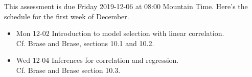\documentclass{ccg-topic}
\author{Colton Grainger}
\date{2019-11-29}
\begin{document}
\maketitle

\begin{center}
\end{center}

This assessment is due Friday 2019-12-06 at 08:00 Mountain Time.
Here's the schedule for the first week of December.

\begin{itemize}
    \item Mon 12-02 Introduction to model selection with linear correlation. \\
Cf. Brase and Brase, sections 10.1 and 10.2.
    \item Wed 12-04 Inferences for correlation and regression.\\Cf. Brase and Brase section 10.3.
\end{itemize}
\end{document}
